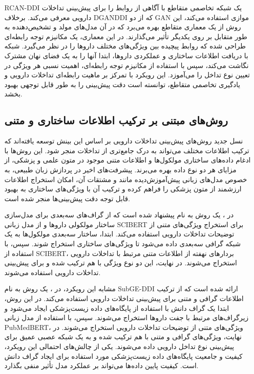 RCAN-DDI \cite{ref_zhang2024} یک شبکه تخاصمی متقاطع با آگاهی از روابط را برای پیش‌بینی تداخلات دارویی معرفی می‌کند. برخلاف DGANDDI که از دو GAN موازی استفاده می‌کند، این روش از یک معماری متقاطع بهره می‌برد که در آن مدل‌های مولد و تشخیص‌دهنده به طور متقابل بر روی یکدیگر تأثیر می‌گذارند. در این معماری، یک مکانیزم توجه رابطه‌ای طراحی شده که روابط پیچیده بین ویژگی‌های مختلف داروها را در نظر می‌گیرد. شبکه با دریافت اطلاعات ساختاری و عملکردی داروها، ابتدا آنها را به یک فضای نهان مشترک نگاشت می‌کند، سپس با استفاده از مکانیزم توجه رابطه‌ای، اهمیت نسبی هر ویژگی در تعیین نوع تداخل را می‌آموزد. این رویکرد با تمرکز بر ماهیت رابطه‌ای تداخلات دارویی و یادگیری تخاصمی متقاطع، توانسته است دقت پیش‌بینی را به طور قابل توجهی بهبود بخشد.

\subsection{روش‌های مبتنی بر ترکیب اطلاعات ساختاری و متنی}

نسل جدید روش‌های پیش‌بینی تداخلات دارویی بر اساس این بینش توسعه یافته‌اند که ترکیب اطلاعات مختلف می‌تواند به درک جامع‌تری از تداخلات منجر شود. این روش‌ها با ادغام داده‌های ساختاری مولکول‌ها و اطلاعات متنی موجود در متون علمی و پزشکی، از مزایای هر دو نوع داده بهره می‌برند. پیشرفت‌های اخیر در پردازش زبان طبیعی، به خصوص مدل‌های زبانی پیش‌آموزش‌دیده مانند  و مشتقات آن، امکان استخراج اطلاعات ارزشمند از متون پزشکی را فراهم کرده و ترکیب آن با ویژگی‌های ساختاری به بهبود قابل توجه دقت پیش‌بینی‌ها منجر شده است.

در \cite{ref_he2023}، یک روش به نام  پیشنهاد شده است که از گراف‌های سه‌بعدی برای مدل‌سازی ساختار مولکولی داروها و از مدل زبانی SCIBERT برای استخراج ویژگی‌های متنی از توضیحات تداخلات دارویی استفاده می‌کند. ابتدا، ساختار سه‌بعدی مولکول‌ها به یک شبکه گرافی سه‌بعدی داده می‌شود تا ویژگی‌های ساختاری استخراج شوند. سپس، با استفاده از SCIBERT، بردارهای نهفته از اطلاعات متنی مرتبط با تداخلات دارویی استخراج می‌شوند. در نهایت، این دو نوع ویژگی با هم ترکیب شده و برای پیش‌بینی تداخلات دارویی استفاده می‌شوند.

مشابه این رویکرد، در \cite{ref_shi2024}، یک روش به نام SubGE-DDI ارائه شده است که از ترکیب اطلاعات گرافی و متنی برای پیش‌بینی تداخلات دارویی استفاده می‌کند. در این روش، ابتدا یک گراف دانش با استفاده از پایگاه‌های داده زیست‌پزشکی ایجاد می‌شود و زیرگراف‌های مرتبط با جفت داروها استخراج می‌شوند. سپس، با استفاده از مدل زبانی PubMedBERT، ویژگی‌های متنی از توضیحات تداخلات دارویی استخراج می‌شوند. در نهایت، ویژگی‌های گرافی و متنی با هم ترکیب شده و به یک شبکه عصبی عمیق برای پیش‌بینی نوع تداخل دارویی داده می‌شوند. یکی از چالش‌های احتمالی این رویکرد، کیفیت و جامعیت پایگاه‌های داده زیست‌پزشکی مورد استفاده برای ایجاد گراف دانش است. کیفیت پایین داده‌ها می‌تواند بر عملکرد مدل تأثیر منفی بگذارد.


